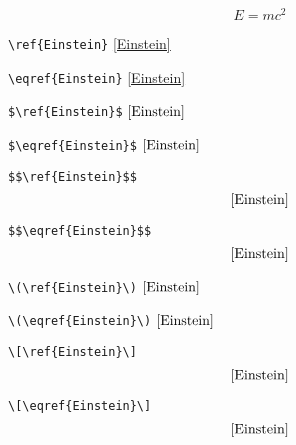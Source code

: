 \documentclass{article}
\begin{document}
\begin{equation}
E = m c^2\label{Einstein}
\end{equation}

\verb+\ref{Einstein}+ \ref{Einstein}

\verb+\eqref{Einstein}+ \eqref{Einstein}

\verb+$\ref{Einstein}$+ $\ref{Einstein}$

\verb+$\eqref{Einstein}$+ $\eqref{Einstein}$

\verb+$$\ref{Einstein}$$+ $$\ref{Einstein}$$

\verb+$$\eqref{Einstein}$$+ $$\eqref{Einstein}$$

\verb+\(\ref{Einstein}\)+ \(\ref{Einstein}\)

\verb+\(\eqref{Einstein}\)+ \(\eqref{Einstein}\)

\verb+\[\ref{Einstein}\]+ \[\ref{Einstein}\]

\verb+\[\eqref{Einstein}\]+ \[\eqref{Einstein}\]
\end{document}
